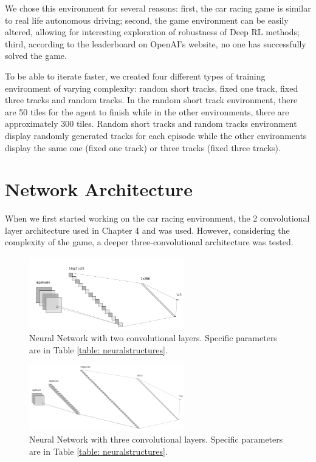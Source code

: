 \par
We chose this environment for several reasons: first, the car racing game is similar to real life autonomous driving; second, the game environment can be easily altered, allowing for interesting exploration of robustness of Deep RL methods; third, according to the leaderboard on OpenAI's website, no one has successfully solved the game. 
\par
To be able to iterate faster, we created four different types of training environment of varying complexity: random short tracks, fixed one track, fixed three tracks and random tracks. In the random short track environment, there are 50 tiles for the agent to finish while in the other environments, there are approximately 300 tiles. Random short tracks and random tracks environment display randomly generated tracks for each episode while the other environments display the same one (fixed one track) or three tracks (fixed three tracks).

\section{Network Architecture}
When we first started working on the car racing environment, the 2 convolutional layer architecture used in Chapter 4 and \cite{mnih2013playing} was used. However, considering the complexity of the game, a deeper three-convolutional architecture was tested.

\begin{figure}[h]
\centering
\includegraphics[width=0.6\textwidth]{Graphics/nn_crop2.png}
\caption[Two Convolutional Neural Network Structure]{Neural Network with two convolutional layers. Specific parameters are in Table \ref{table: neuralstructures}.}
\label{fig:2conv}
\end{figure}

\begin{figure}[h]
\centering
\includegraphics[width=0.6\textwidth]{Graphics/nn_crop3.png}
\caption[Three Convolutional Neural Network Structure]{Neural Network with three convolutional layers. Specific parameters are in Table \ref{table: neuralstructures}.}
\label{fig:3conv}
\end{figure}

